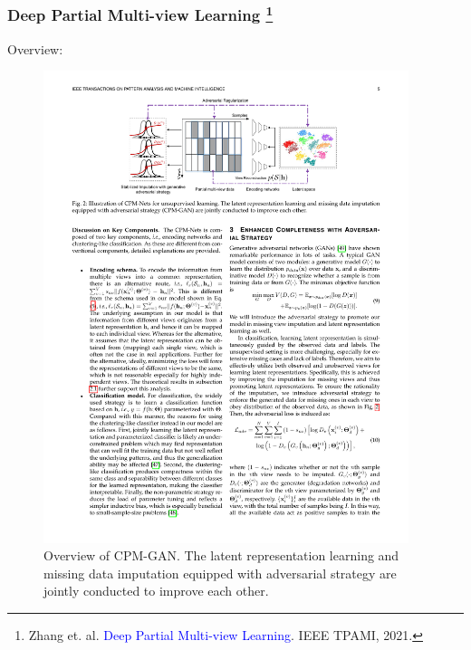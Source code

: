 \documentclass[notheorems, aspectratio=54]{beamer}
\begin{document}
\begin{frame} \frametitle{Deep Partial Multi-view Learning \footnote{Zhang et. al. \textcolor{blue}{Deep Partial Multi-view Learning}. IEEE TPAMI, 2021.}}

Overview:

\begin{figure}
\centering
\includegraphics[width=0.95\textwidth]{./fig/overview_cpm_gan.pdf}
\caption{Overview of CPM-GAN. The latent representation learning and missing data imputation equipped with adversarial strategy are jointly conducted to improve each other.}
\label{fig:overview_cpm_gan}
\end{figure}


\end{frame}
\end{document}
